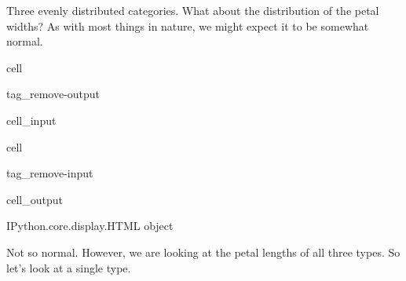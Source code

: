\documentclass[letterpaper,10pt,english]{jupyterBook}
\begin{document}
\sphinxAtStartPar
Three evenly distributed categories. What about the distribution of the petal widths? As with most things in nature, we might expect it to be somewhat normal.

\label{\detokenize{task2_c/example_sup_class/sup_class_ex-process:sup-class-ex-descriptive-visuals-histograms}}
\begin{sphinxuseclass}{cell}
\begin{sphinxuseclass}{tag_remove-output}\begin{sphinxVerbatimInput}

\begin{sphinxuseclass}{cell_input}
\begin{sphinxVerbatim}[commandchars=\\\{\}]
  \PYG{p}{[}\PYG{p}{]}     
\end{sphinxVerbatim}

\end{sphinxuseclass}\end{sphinxVerbatimInput}

\end{sphinxuseclass}
\end{sphinxuseclass}
\begin{sphinxuseclass}{cell}
\begin{sphinxuseclass}{tag_remove-input}\begin{sphinxVerbatimOutput}

\begin{sphinxuseclass}{cell_output}
\begin{sphinxVerbatim}[commandchars=\\\{\}]
\PYGZlt{}IPython.core.display.HTML object\PYGZgt{}
\end{sphinxVerbatim}

\end{sphinxuseclass}\end{sphinxVerbatimOutput}

\end{sphinxuseclass}
\end{sphinxuseclass}
\sphinxAtStartPar
Not so normal. However, we are looking at the petal lengths of all three types. So let’s look at a single type.
\end{document}
